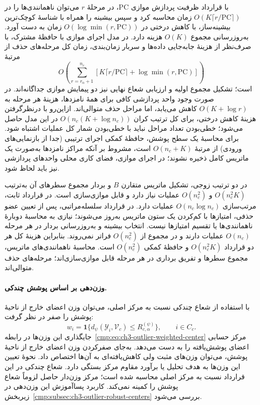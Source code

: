 با قرارداد ظرفیت پردازش موازی $\mathrm{PC}$،
در مرحلهٔ $r$ می‌توان ناهمانندی‌ها را در
$O(K\lceil r/\mathrm{PC}\rceil)$ زمان
محاسبه کرد و سپس بیشینه را همراه با شناسهٔ
کوچک‌ترین بیشینه‌ساز، با کاهش درختی در
$O(\log\min(r,\mathrm{PC}))$ زمان به دست آورد.
به‌روزرسانی مجموع $O(K)$ هزینه دارد. در مدل
اجرای موازی با حافظهٔ مشترک، با صرف‌نظر از
هزینهٔ جابه‌جایی داده‌ها و سربار زمان‌بندی،
زمان کل مرحله‌های حذف از مرتبهٔ
\[
O\left(\sum_{r=r_\alpha+1}^{n_c}
\left[K\lceil r/\mathrm{PC}\rceil+
\log\min(r,\mathrm{PC})\right]\right)
\]
است؛ تشکیل مجموع اولیه و ارزیابی شعاع نهایی
نیز دو پیمایش موازی جداگانه‌اند. در صورت
وجود واحد پردازشی کافی برای همهٔ نامزدها،
هزینهٔ هر مرحله به $O(K+\log r)$ کاهش
می‌یابد، اما مراحل حذف متوالی‌اند. ازاین‌رو
با درنظرگرفتن هزینهٔ کاهش درختی، برای کل ترتیب
کران $O(n_c(K+\log n_c))$ در این مدل حاصل
می‌شود؛ خطی‌بودن تعداد مراحل نباید با خطی‌بودن
شمار کل عملیات اشتباه شود. برای محاسبهٔ یک
سطح پوشش، حافظهٔ کمکی اجرای ترتیبی (جدا از
بازنمایی‌های ورودی) از مرتبهٔ $O(n_c+K)$ است،
مشروط بر آنکه مراکز نامزدها به‌صورت یک ماتریس
کامل ذخیره نشوند؛ در اجرای موازی، فضای کاری
محلی واحدهای پردازشی نیز باید لحاظ شود.

در دو ترتیب زوجی، تشکیل ماتریس متقارن $B$
و بردار مجموع سطرهای آن به‌ترتیب
$O(n_c^2K)$ و $O(n_c^2)$ عملیات نیاز دارد و
قابل موازی‌سازی است. در قرارداد ثابت، مرتب‌سازی
$O(n_c\log n_c)$ عملیات دارد. در قرارداد
سلسله‌مراتبی، پس از تعیین عضو حذفی، امتیازها با
کم‌کردن یک ستون ماتریس به‌روز می‌شوند؛ نیازی به
محاسبهٔ دوبارهٔ ناهمانندی‌ها یا تقسیم امتیازها نیست.
انتخاب بیشینه و به‌روزرسانی بردار در هر مرحله
$O(n_c)$ عملیات دارند و در مجموع از
$O(n_c^2)$ فراتر نمی‌روند. بنابراین هزینهٔ کل
هر دو قرارداد $O(n_c^2K)$ و حافظهٔ کمکی
$O(n_c^2)$ است. محاسبهٔ ناهمانندی‌های ماتریس،
مجموع سطرها و تفریق برداری در هر مرحله قابل
موازی‌سازی‌اند؛ مرحله‌های حذف متوالی‌اند.

\paragraph{وزن‌دهی بر اساس پوشش چندکی.}
با استفاده از شعاع چندکی نسبت به مرکز اصلی،
می‌توان وزن اعضای خارج از ناحیهٔ پوشش را صفر
در نظر گرفت:
\begin{equation}\label{cmp:eq:ch3-quantile-hard-weights}
w_i=\mathbf1\{d_\psi(\mathscr Y_i,\mathcal V_c)
\le R_{c,\alpha}^{(\psi)}\},
\qquad i\in C_c.
\end{equation}
جایگذاری این وزن‌ها در
رابطه~\eqref{cmp:eq:ch3-outlier-weighted-center}
مرکز حسابی اعضای پوشش‌یافته را به دست می‌دهد.
به‌جای صفرکردن وزن اعضای خارج از ناحیهٔ پوشش،
می‌توان وزن‌های مثبت ولی کاهش‌یافته‌ای به آن‌ها
اختصاص داد. نحوهٔ تعیین این وزن‌ها به هدف تحلیل
یا برآورد مقاوم مرکز بستگی دارد. شعاع چندکی در
این قرارداد نسبت به مرکز اصلی محاسبه شده است؛
مرکز وزن‌دار حاصل لزوماً شعاع پوشش را کمینه
نمی‌کند. کاربرد پساآموزش این وزن‌دهی در
زیربخش~\ref{cmp:subsec:ch3-outlier-robust-centers}
بررسی می‌شود.

